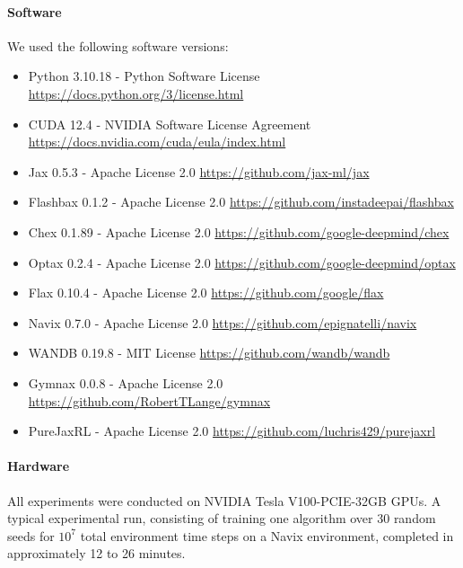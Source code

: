 \documentclass[letterpaper]{article}
\begin{document}
\begin{appendix}
\paragraph{Software} We used the following software versions:
\begin{itemize}
    \item Python 3.10.18 - Python Software License \url{https://docs.python.org/3/license.html}
    \item CUDA 12.4 - NVIDIA Software License Agreement \url{https://docs.nvidia.com/cuda/eula/index.html}
    \item Jax 0.5.3 - Apache License 2.0 \url{https://github.com/jax-ml/jax}
    \item Flashbax 0.1.2 - Apache License 2.0 \url{https://github.com/instadeepai/flashbax}
    \item Chex 0.1.89 - Apache License 2.0 \url{https://github.com/google-deepmind/chex}
    \item Optax 0.2.4 - Apache License 2.0 \url{https://github.com/google-deepmind/optax}
    \item Flax 0.10.4 - Apache License 2.0 \url{https://github.com/google/flax}
    \item Navix 0.7.0 - Apache License 2.0 \url{https://github.com/epignatelli/navix}
    \item WANDB 0.19.8 - MIT License \url{https://github.com/wandb/wandb}
    \item Gymnax 0.0.8 - Apache License 2.0 \url{https://github.com/RobertTLange/gymnax}
    \item PureJaxRL - Apache License 2.0 \url{https://github.com/luchris429/purejaxrl}
\end{itemize}
\paragraph{Hardware} All experiments were conducted on NVIDIA Tesla V100-PCIE-32GB GPUs. A typical experimental run, consisting of training one algorithm over 30 random seeds for $10^7$ total environment time steps on a Navix environment, completed in approximately 12 to 26 minutes.

\end{appendix}
\end{document}
